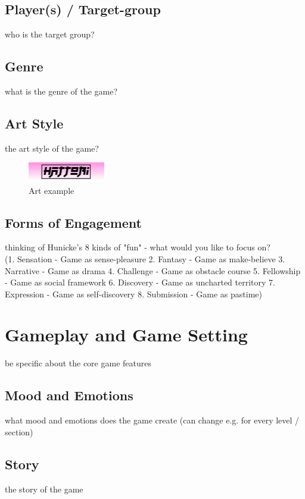 \documentclass[a4paper]{scrreprt}
\begin{document}
\section{Player(s) / Target-group}
who is the target group? 

\section{Genre}
what is the genre of the game?

\section{Art Style}
the art style of the game?

\begin{figure}
\centering
\includegraphics[width=0.3\textwidth]{HattoriLogo.png}
\caption{\label{fig:art} Art example}
\end{figure}

\section{Forms of Engagement}
thinking of Hunicke's 8 kinds of "fun" - what would you like to focus on?\\
(1. Sensation - Game as sense-pleasure 
2. Fantasy - Game as make-believe
3. Narrative - Game as drama
4. Challenge - Game as obstacle course
5. Fellowship -  Game as social framework
6. Discovery - Game as uncharted territory 
7. Expression - Game as self-discovery 
8. Submission - Game as pastime)



\chapter{Gameplay and Game Setting}
be specific about the core game features 

\section{Mood and Emotions}
what mood and emotions does the game create (can change e.g. for every level / section) 

\section{Story}
the story of the game
\end{document}
